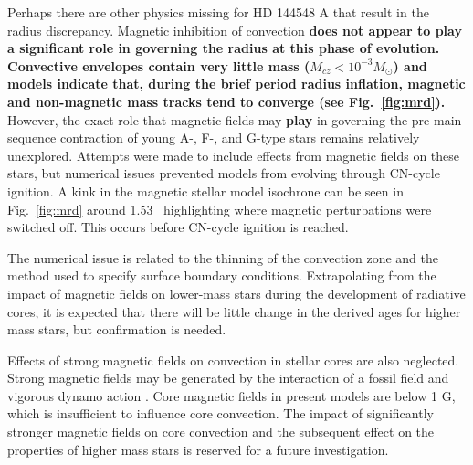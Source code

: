\documentclass{aa}
\begin{document}
Perhaps there are other physics missing for HD 144548 A that result in the radius discrepancy. Magnetic inhibition of convection {\bf does not appear to play a significant role in governing the radius at this phase of evolution. Convective envelopes contain very little mass ($M_{cz} < 10^{-3} M_{\odot}$) and models indicate that, during the brief period radius inflation, magnetic and non-magnetic mass tracks tend to converge (see Fig.~\ref{fig:mrd}).} However, the exact role that magnetic fields may {\bf play} in governing the pre-main-sequence contraction of young A-, F-, and G-type stars remains relatively unexplored. Attempts were made to include effects from magnetic fields on these stars, but numerical issues prevented models from evolving through CN-cycle ignition. A kink in the magnetic stellar model isochrone can be seen in Fig.\ \ref{fig:mrd} around 1.53 \msun\ highlighting where magnetic perturbations were switched off. This occurs before CN-cycle ignition is reached.  

The numerical issue is related to the thinning of the convection zone and the method used to specify surface boundary conditions. 
Extrapolating from the impact of magnetic fields on lower-mass stars during the development of radiative cores, it is expected that there will be little change in the derived ages for higher mass stars, but confirmation is needed.

Effects of strong magnetic fields on convection in stellar cores are also neglected. Strong magnetic fields may be generated by the interaction of a fossil field and vigorous dynamo action \citep[e.g.,][]{Featherstone2009}. Core magnetic fields in present models are below 1 G, which is insufficient to influence core convection. The impact of significantly stronger magnetic fields on core convection and the subsequent effect on the properties of higher mass stars is reserved for a future investigation. 
\end{document}
